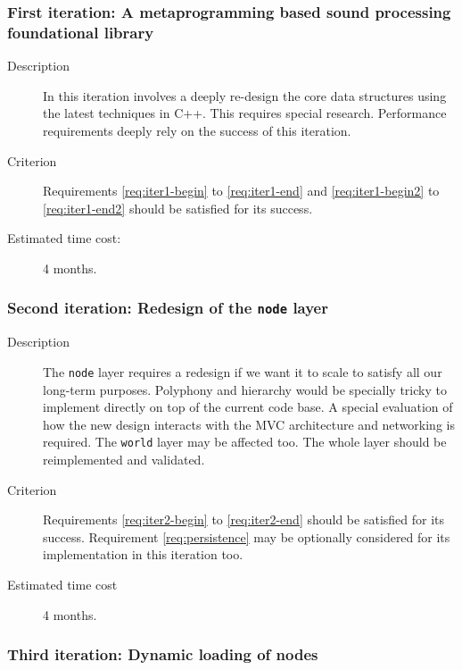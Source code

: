 \subsubsection{First iteration: A metaprogramming based sound
  processing foundational library}

\begin{description}
\item[Description] In this iteration involves a deeply re-design the
  core data structures using the latest techniques in C++. This
  requires special research. Performance requirements deeply rely on
  the success of this iteration.

\item[Criterion] Requirements \ref{req:iter1-begin} to
  \ref{req:iter1-end} and \ref{req:iter1-begin2} to
  \ref{req:iter1-end2} should be satisfied for its success.

\item[Estimated time cost:] 4 months.
\end{description}

\subsubsection{Second iteration: Redesign of the \texttt{node} layer}

\begin{description}
\item[Description] The \texttt{node} layer requires a redesign if we
  want it to scale to satisfy all our long-term purposes. Polyphony
  and hierarchy would be specially tricky to implement directly on top
  of the current code base. A special evaluation of how the new design
  interacts with the MVC architecture and networking is required. The
  \texttt{world} layer may be affected too. The whole layer should be
  reimplemented and validated.

\item[Criterion] Requirements \ref{req:iter2-begin} to
  \ref{req:iter2-end} should be satisfied for its success. Requirement
  \ref{req:persistence} may be optionally considered for its
  implementation in this iteration too.

  \item[Estimated time cost] 4 months.
\end{description}

\subsubsection{Third iteration: Dynamic loading of nodes}

